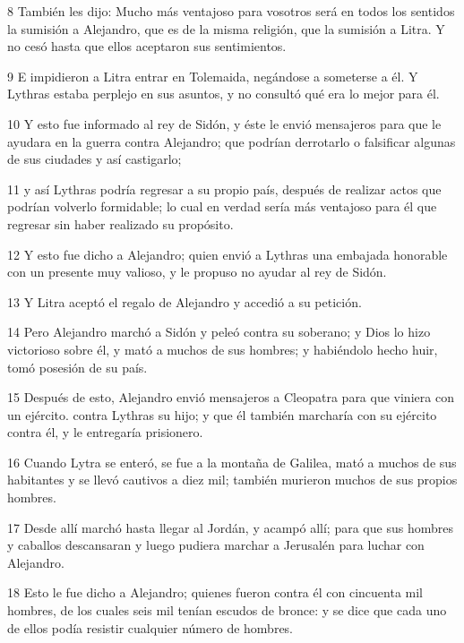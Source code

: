 \par 8 También les dijo: Mucho más ventajoso para vosotros será en todos los sentidos la sumisión a Alejandro, que es de la misma religión, que la sumisión a Litra. Y no cesó hasta que ellos aceptaron sus sentimientos.

\par 9 E impidieron a Litra entrar en Tolemaida, negándose a someterse a él. Y Lythras estaba perplejo en sus asuntos, y no consultó qué era lo mejor para él.

\par 10 Y esto fue informado al rey de Sidón, y éste le envió mensajeros para que le ayudara en la guerra contra Alejandro; que podrían derrotarlo o falsificar algunas de sus ciudades y así castigarlo;

\par 11 y así Lythras podría regresar a su propio país, después de realizar actos que podrían volverlo formidable; lo cual en verdad sería más ventajoso para él que regresar sin haber realizado su propósito.

\par 12 Y esto fue dicho a Alejandro; quien envió a Lythras una embajada honorable con un presente muy valioso, y le propuso no ayudar al rey de Sidón.

\par 13 Y Litra aceptó el regalo de Alejandro y accedió a su petición.

\par 14 Pero Alejandro marchó a Sidón y peleó contra su soberano; y Dios lo hizo victorioso sobre él, y mató a muchos de sus hombres; y habiéndolo hecho huir, tomó posesión de su país.

\par 15 Después de esto, Alejandro envió mensajeros a Cleopatra para que viniera con un ejército. contra Lythras su hijo; y que él también marcharía con su ejército contra él, y le entregaría prisionero.

\par 16 Cuando Lytra se enteró, se fue a la montaña de Galilea, mató a muchos de sus habitantes y se llevó cautivos a diez mil; también murieron muchos de sus propios hombres.

\par 17 Desde allí marchó hasta llegar al Jordán, y acampó allí; para que sus hombres y caballos descansaran y luego pudiera marchar a Jerusalén para luchar con Alejandro.

\par 18 Esto le fue dicho a Alejandro; quienes fueron contra él con cincuenta mil hombres, de los cuales seis mil tenían escudos de bronce: y se dice que cada uno de ellos podía resistir cualquier número de hombres.

